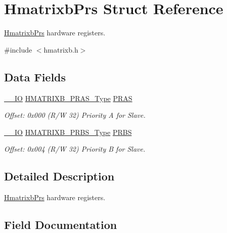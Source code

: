 \hypertarget{struct_hmatrixb_prs}{}\section{Hmatrixb\+Prs Struct Reference}
\label{struct_hmatrixb_prs}


\mbox{\hyperlink{struct_hmatrixb_prs}{Hmatrixb\+Prs}} hardware registers.  




{\ttfamily \#include $<$hmatrixb.\+h$>$}

\subsection*{Data Fields}
\begin{DoxyCompactItemize}
\item 
\mbox{\hyperlink{core__cm0plus_8h_aec43007d9998a0a0e01faede4133d6be}{\+\_\+\+\_\+\+IO}} \mbox{\hyperlink{union_h_m_a_t_r_i_x_b___p_r_a_s___type}{H\+M\+A\+T\+R\+I\+X\+B\+\_\+\+P\+R\+A\+S\+\_\+\+Type}} \mbox{\hyperlink{struct_hmatrixb_prs_abba63111d9c6577aacf8976bf0fcaa4f}{P\+R\+AS}}
\begin{DoxyCompactList}\small\item\em Offset\+: 0x000 (R/W 32) Priority A for Slave. \end{DoxyCompactList}\item 
\mbox{\hyperlink{core__cm0plus_8h_aec43007d9998a0a0e01faede4133d6be}{\+\_\+\+\_\+\+IO}} \mbox{\hyperlink{union_h_m_a_t_r_i_x_b___p_r_b_s___type}{H\+M\+A\+T\+R\+I\+X\+B\+\_\+\+P\+R\+B\+S\+\_\+\+Type}} \mbox{\hyperlink{struct_hmatrixb_prs_a87cec3294a236e052862ec2f77c30909}{P\+R\+BS}}
\begin{DoxyCompactList}\small\item\em Offset\+: 0x004 (R/W 32) Priority B for Slave. \end{DoxyCompactList}\end{DoxyCompactItemize}


\subsection{Detailed Description}
\mbox{\hyperlink{struct_hmatrixb_prs}{Hmatrixb\+Prs}} hardware registers. 

\subsection{Field Documentation}
\mbox{\label{struct_hmatrixb_prs_abba63111d9c6577aacf8976bf0fcaa4f}} 
